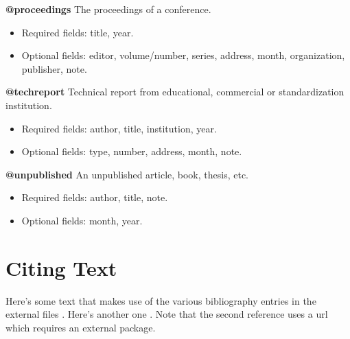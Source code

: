 \documentclass[a4paper,12pt]{article}
\begin{document}
\textbf{@proceedings}
The proceedings of a conference.
\begin{itemize}
\item Required fields: title, year.
\item Optional fields: editor, volume/number, series, address, month,
        organization, publisher, note.
\end{itemize}

\textbf{@techreport} 
Technical report from educational, commercial or standardization institution.
\begin{itemize}
\item Required fields: author, title, institution, year.
\item Optional fields: type, number, address, month, note.
\end{itemize}

\textbf{@unpublished}
An unpublished article, book, thesis, etc.
\begin{itemize}
\item Required fields: author, title, note.
\item Optional fields: month, year.
\end{itemize}

\section{Citing Text}
Here's some text that makes use of the various bibliography entries in the
external files \cite{Abedon1994}.  Here's another one
\cite{website:fermentas-lambda}.  Note that the second reference uses a url
which requires an external package.



\end{document}
